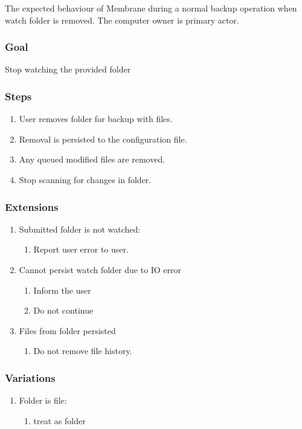 \documentclass[11pt, a4paper, twocolumn, twoside]{report}
\begin{document}
The expected behaviour of Membrane during a normal backup operation when watch folder is removed. The computer owner is primary actor.

\subsubsection{Goal}

Stop watching the provided folder

\subsubsection{Steps}

\begin{enumerate}
 \item User removes folder for backup with files.
 \item Removal is persisted to the configuration file.
 \item Any queued modified files are removed.
 \item Stop scanning for changes in folder.
\end{enumerate}

\subsubsection{Extensions}
\begin{enumerate}
  \item Submitted folder is not watched:
	\begin{enumerate}
	  \item Report user error to user.
	\end{enumerate}
  \item Cannot persist watch folder due to IO error
	\begin{enumerate}
	  \item Inform the user
	  \item Do not continue
	\end{enumerate}
  \item Files from folder persisted
	\begin{enumerate}
	  \item Do not remove file history.
	\end{enumerate}
\end{enumerate}


\subsubsection{Variations}
\begin{enumerate}
  \item Folder is file:
	\begin{enumerate}
	  \item treat as folder
	\end{enumerate}
\end{enumerate}
\end{document}
